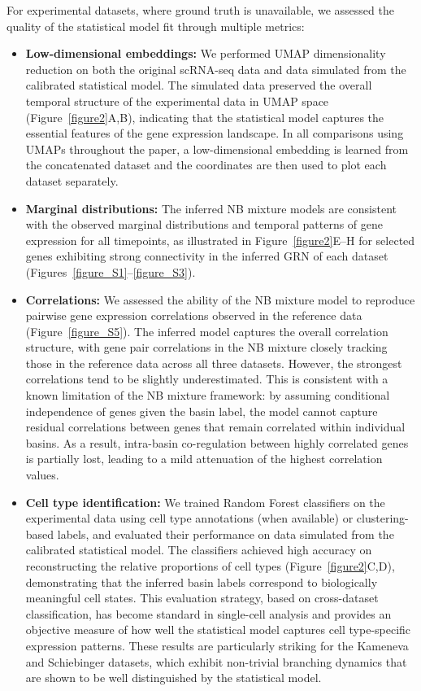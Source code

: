 \documentclass[a4paper, 11pt]{article}
\theoremstyle{plain}
\theoremstyle{remark}
\newcommand*{\firstreview}[1]{{\color{black}#1}}
\begin{document}
For experimental datasets, where ground truth is unavailable, we assessed the quality of the statistical model fit through multiple metrics:
\begin{itemize}
    \item \textbf{Low-dimensional embeddings:} We performed UMAP dimensionality reduction on both the original scRNA-seq data and data simulated from the calibrated statistical model. The simulated data preserved the overall temporal structure of the experimental data in UMAP space (Figure~\ref{figure2}A,B), indicating that the statistical model captures the essential features of the gene expression landscape. In all comparisons using UMAPs throughout the paper, a low-dimensional embedding is learned from the concatenated dataset and the coordinates are then used to plot each dataset separately.
    \item \textbf{Marginal distributions:} The inferred NB mixture models \firstreview{are consistent with} the observed marginal distributions and temporal patterns of gene expression for all timepoints, as illustrated in Figure~\ref{figure2}E--H for selected genes exhibiting strong connectivity in the inferred GRN of each dataset (Figures~\ref{figure_S1}--\ref{figure_S3}).
    \item \textbf{Correlations:} We assessed the ability of the NB mixture model to reproduce pairwise gene expression correlations observed in the reference data (Figure~\ref{figure_S5}). The inferred model captures the overall correlation structure, with gene pair correlations in the NB mixture closely tracking those in the reference data across all three datasets. However, the strongest correlations tend to be slightly underestimated. This is consistent with a known limitation of the NB mixture framework: by assuming conditional independence of genes given the basin label, the model cannot capture residual correlations between genes that remain correlated within individual basins. As a result, intra-basin co-regulation between highly correlated genes is partially lost, leading to a mild attenuation of the highest correlation values. 
    \item \textbf{Cell type identification:} We trained Random Forest classifiers on the experimental data using cell type annotations (when available) or clustering-based labels, and evaluated their performance on data simulated from the calibrated statistical model. The classifiers achieved high accuracy on reconstructing the relative proportions of cell types (Figure~\ref{figure2}C,D), demonstrating that the inferred basin labels correspond to biologically meaningful cell states. This evaluation strategy, based on cross-dataset classification, has become standard in single-cell analysis \cite{stuart2019comprehensive} and provides an objective measure of how well the statistical model captures cell type-specific expression patterns.
    These results are particularly striking for the Kameneva and Schiebinger datasets, which exhibit non-trivial branching dynamics that are shown to be well distinguished by the statistical model.
\end{itemize}
\end{document}
